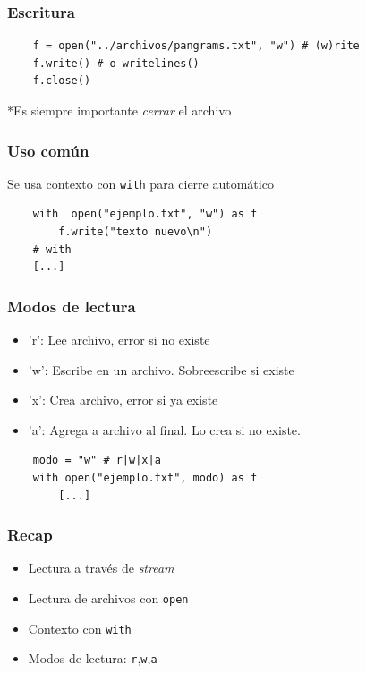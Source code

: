 \documentclass[14pt,aspectratio=169,xcolor=dvipsnames]{beamer}
\newcommand{\code}[1]{{\color{purple}\tt#1}}
\begin{document}
\begin{frame}[fragile]\frametitle{Escritura}
    \begin{verbatim}
    f = open("../archivos/pangrams.txt", "w") # (w)rite
    f.write() # o writelines()
    f.close()
    \end{verbatim}

*Es siempre importante \emph{cerrar} el archivo
\end{frame}
\begin{frame}[fragile]\frametitle{Uso común}
    Se usa contexto con {\color{purple}\texttt{with}} para cierre automático
    \begin{verbatim}
    with  open("ejemplo.txt", "w") as f
        f.write("texto nuevo\n") 
    # with
    [...]
    \end{verbatim}
\end{frame}
\begin{frame}[fragile]\frametitle{Modos de lectura}
    \begin{itemize}
        \item 'r': Lee archivo, error si no existe
        \item 'w': Escribe en un archivo. Sobreescribe si existe
        \item 'x': Crea archivo, error si ya existe
        \item 'a': Agrega a archivo al final. Lo crea si no existe.

    \end{itemize}
    
    \vspace{1cm}
    \begin{verbatim}
    modo = "w" # r|w|x|a
    with open("ejemplo.txt", modo) as f
        [...]
    \end{verbatim}
\end{frame}
\begin{frame}


\end{frame}
\begin{frame}\frametitle{Recap}
    \begin{itemize}
        \item Lectura a través de \emph{stream}
        \item Lectura de archivos con \code{open}
        \item Contexto con \code{with}
        \item Modos de lectura: \code{r},\code{w},\code{a}
    \end{itemize}
\end{frame}
\begin{frame}
    \maketitle
\end{frame}
\end{document}
